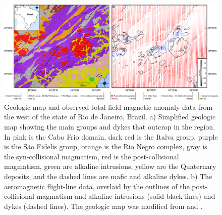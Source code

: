\begin{figure}[tb!]
\centering
\includegraphics[width=1\linewidth]{figures/real-data-geology.png}
\caption{
  Geologic map and observed total-field magnetic anomaly data from the west of the state of Rio de Janeiro, Brazil.
  a) Simplified geologic map showing the main groups and dykes that outcrop in the region.
  In pink is the Cabo Frio domain, dark red is the Italva group, purple is the São Fidelis group, orange is the Rio Negro complex, gray is the syn-collisional magmatism, red is the post-collisional magmatism, green are alkaline intrusions, yellow are the Quaternary deposits, and the dashed lines are mafic and alkaline dykes.
  b) The aeromagnetic flight-line data, overlaid by the outlines of the post-collisional magmatism and alkaline intrusions (solid black lines) and dykes (dashed lines).
  The geologic map was modified from \citet{Heilbron2016} and \citet{Dantas2017}.
}
\label{fig:rio_context}
\end{figure}

